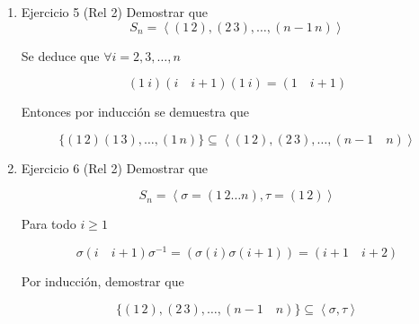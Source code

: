 \documentclass{article}
\begin{document}
\begin{enumerate}[1)]
\item Ejercicio 5 (Rel 2) Demostrar que 
\begin{equation*}
S_n=\left\langle (1\,2),(2\,3),\ldots,(n-1\, n)\right\rangle
\end{equation*}

Se deduce que $\forall i=2,3,\ldots,n$

\begin{equation*}
(1\:i)(i\quad i+1)(1\:i)=(1\quad i+1)
\end{equation*}

Entonces por inducción se demuestra que 

\begin{equation*}
\{(1\,2)(1\,3),\ldots,(1\,n)\}\subseteq\left\langle(1\,2),(2\,3),\ldots,(n-1\quad n)\right\rangle
\end{equation*}

\item Ejercicio 6 (Rel 2) Demostrar que

\begin{equation*}
S_n=\left\langle \sigma=(1\,2\ldots n),\tau=(1\,2)\right\rangle
\end{equation*}

Para todo $i\geq 1$

\begin{equation*}
\sigma(i \quad i+1)\sigma^{-1}=(\sigma(i)\sigma(i+1))=(i+1\quad i+2)
\end{equation*}

Por inducción, demostrar que 

\begin{equation*}
\{(1\,2),(2\,3),\ldots,(n-1\quad n)\}\subseteq \left\langle\sigma,\tau\right\rangle
\end{equation*}
\end{enumerate}
\end{document}
